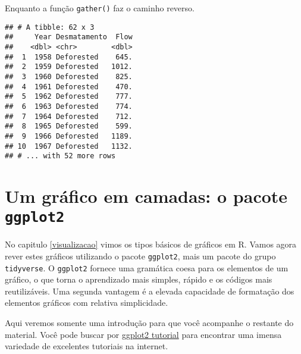 \documentclass[
]{book}
\newenvironment{Shaded}{\begin{snugshade}}{\end{snugshade}}
\newcommand{\DataTypeTok}[1]{\textcolor[rgb]{0.13,0.29,0.53}{#1}}
\newcommand{\KeywordTok}[1]{\textcolor[rgb]{0.13,0.29,0.53}{\textbf{#1}}}
\newcommand{\NormalTok}[1]{#1}
\newcommand{\OperatorTok}[1]{\textcolor[rgb]{0.81,0.36,0.00}{\textbf{#1}}}
\newcommand{\StringTok}[1]{\textcolor[rgb]{0.31,0.60,0.02}{#1}}
\begin{document}
Enquanto a função \texttt{gather()} faz o caminho reverso.

\begin{Shaded}
\end{Shaded}

\begin{verbatim}
## # A tibble: 62 x 3
##     Year Desmatamento  Flow
##    <dbl> <chr>        <dbl>
##  1  1958 Deforested    645.
##  2  1959 Deforested   1012.
##  3  1960 Deforested    825.
##  4  1961 Deforested    470.
##  5  1962 Deforested    777.
##  6  1963 Deforested    774.
##  7  1964 Deforested    712.
##  8  1965 Deforested    599.
##  9  1966 Deforested   1189.
## 10  1967 Deforested   1132.
## # ... with 52 more rows
\end{verbatim}

\hypertarget{ggplot2}{%
\chapter{\texorpdfstring{Um gráfico em camadas: o pacote \texttt{ggplot2}}{Um gráfico em camadas: o pacote ggplot2}}\label{ggplot2}}

No capitulo \ref{visualizacao} vimos os tipos básicos de gráficos em R. Vamos agora rever estes gráficos utilizando o pacote \texttt{ggplot2}, mais um pacote do grupo \texttt{tidyverse}. O \texttt{ggplot2} fornece uma gramática coesa para os elementos de um gráfico, o que torna o aprendizado mais simples, rápido e os códigos mais reutilizáveis. Uma segunda vantagem é a elevada capacidade de formatação dos elementos gráficos com relativa simplicidade.

Aqui veremos somente uma introdução para que você acompanhe o restante do material. Você pode buscar por \href{https://www.google.com/search?hl=pt-BR\&sxsrf=ALeKk01rZWda0HD1IRGtCyelLv79_WDmkg\%3A1594409577512\&source=hp\&ei=acIIX9HVG4vD5OUPgamfOA\&q=ggplot2+tutorial\&oq=ggplot2+tutorial\&gs_lcp=CgZwc3ktYWIQAzIECCMQJzICCAAyBggAEBYQHjIGCAAQFhAeMgYIABAWEB4yBggAEBYQHjIGCAAQFhAeMgYIABAWEB4yBggAEBYQHjIGCAAQFhAeUJILWJILYJIhaABwAHgAgAF5iAF5kgEDMC4xmAEAoAECoAEBqgEHZ3dzLXdpeg\&sclient=psy-ab\&ved=0ahUKEwiRrvbDtsPqAhWLIbkGHYHUBwcQ4dUDCAc\&uact=5}{ggplot2 tutorial} para encontrar uma imensa variedade de excelentes tutoriais na internet.
\end{document}
